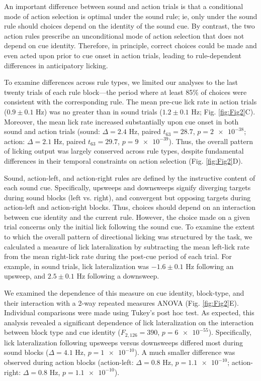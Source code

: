 

An important difference between sound and action trials is that a conditional mode of action selection \citep{mitz1991learning} is optimal under the sound rule; ie, only under the sound rule should choices depend on the identity of the sound cue. By contrast, the two action rules prescribe an unconditional mode of action selection that does not depend on cue identity. Therefore, in principle, correct choices could be made and even acted upon prior to cue onset in action trials, leading to rule-dependent differences in anticipatory licking.

To examine differences across rule types, we limited our analyses to the last twenty trials of each rule block---the period where at least 85$\%$  of choices were consistent with the corresponding rule. The mean pre-cue lick rate in action trials ($0.9 \pm 0.1$ Hz) was no greater than in sound trials ($1.2 \pm 0.1$ Hz; Fig. \ref{fig:Fig2}C). Moreover, the mean lick rate increased substantially upon cue onset in both sound and action trials (sound: $\Delta=2.4$ Hz, paired $t_{63} =28.7$, $p=\num{2e-38}$; action: $\Delta=2.1$ Hz, paired $t_{63}=29.7$, $p=\num{9e-39}$). Thus, the overall pattern of licking output was largely conserved across rule types, despite fundamental differences in their temporal constraints on action selection (Fig. \ref{fig:Fig2}D).

Sound, action-left, and action-right rules are defined by the instructive content of each sound cue. Specifically, upsweeps and downsweeps signify diverging targets during sound blocks (left vs. right), and convergent but opposing targets during action-left and action-right blocks. Thus, choices should depend on an interaction between cue identity and the current rule. However, the choice made on a given trial concerns only the initial lick following the sound cue. To examine the extent to which the overall pattern of directional licking was structured by the task, we calculated a measure of lick lateralization by subtracting the mean left-lick rate from the mean right-lick rate during the post-cue period of each trial. For example, in sound trials, lick lateralization was $-1.6 \pm 0.1$ Hz following an upsweep, and $2.5 \pm 0.1$ Hz following a downsweep.

We examined the dependence of this measure on cue identity, block-type, and their interaction with a 2-way repeated measures ANOVA  (Fig. \ref{fig:Fig2}E). Individual comparisons were made using Tukey’s post hoc test. As expected, this analysis revealed a significant dependence of lick lateralization on the interaction between block type and cue identity ($F_{2,126}=390$, $p=\num{6e-55}$). Specifically, lick lateralization following upsweeps versus downsweeps differed most during sound blocks ($\Delta=4.1$ Hz, $p=\num{1e-10}$). A much smaller difference was observed during action blocks (action-left: $\Delta=0.8$ Hz, $p=\num{1.1e-10}$; action-right: $\Delta=0.8$ Hz, $p=\num{1.1e-10}$). 

